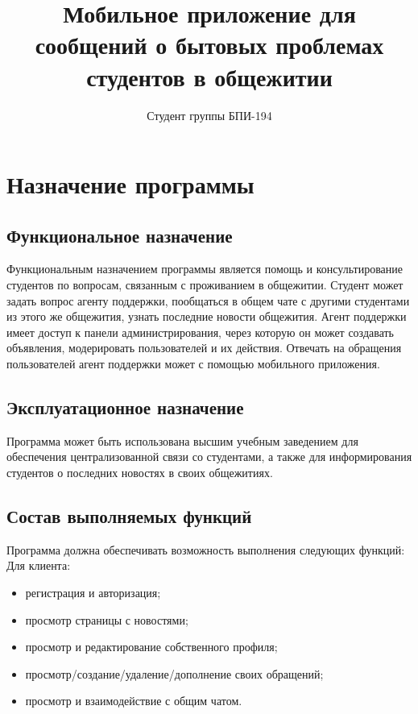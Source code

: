 \documentclass{../includes/TechDoc}
\title{Мобильное приложение для сообщений о бытовых проблемах студентов в общежитии}
\author{Студент группы БПИ-194}{В. А. Анненков}
\begin{document}
    \maketitle

    \tableofcontents


    \section{Назначение программы}

    \subsection{Функциональное назначение}

    Функциональным назначением программы является помощь и консультирование студентов по вопросам, связанным
    с проживанием в общежитии. Студент может задать вопрос агенту поддержки, пообщаться в общем чате с другими
    студентами из этого же общежития, узнать последние новости общежития. Агент поддержки имеет доступ к панели
    администрирования, через которую он может создавать объявления, модерировать пользователей и их действия. Отвечать
    на обращения пользователей агент поддержки может с помощью мобильного приложения.

    \subsection{Эксплуатационное назначение}

    Программа может быть использована высшим учебным заведением для обеспечения централизованной связи со студентами, а
    также для информирования студентов о последних новостях в своих общежитиях.

    \subsection{Состав выполняемых функций}

    Программа должна обеспечивать возможность выполнения следующих функций:\\

    Для клиента:
    \begin{itemize}[noitemsep]
        \item регистрация и авторизация;
        \item просмотр страницы с новостями;
        \item просмотр и редактирование собственного профиля;
        \item просмотр/создание/удаление/дополнение своих обращений;
        \item просмотр и взаимодействие с общим чатом.
    \end{itemize}
\end{document}
